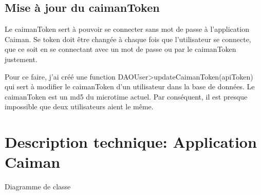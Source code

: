 \documentclass[a4paper,12pt,french]{sphinxmanual}
\begin{document}
\subsection{Mise à jour du caimanToken}
\label{\detokenize{organique:mise-a-jour-du-caimantoken}}
\sphinxAtStartPar
Le caimanToken sert à pouvoir se connecter sans mot de passe à l’application Caiman. Se token doit être changée à chaque fois que l’utilisateur se connecte, que ce soit en se connectant avec un mot de passe ou par le caimanToken justement.

\sphinxAtStartPar
Pour ce faire, j’ai créé une function DAOUser\sphinxhyphen{}>updateCaimanToken(apiToken) qui sert à modifier le caimanToken d’un utilisateur dans la base de données. Le caimanToken est un md5 du microtime actuel. Par conséquent, il est presque impossible que deux utilisateurs aient le même.

\begin{sphinxVerbatim}[commandchars=\\\{\}]

\end{sphinxVerbatim}


\section{Description technique: Application Caiman}
\label{\detokenize{organique:description-technique-application-caiman}}
\sphinxAtStartPar
Diagramme de classe

\sphinxAtStartPar
{}
\end{document}
